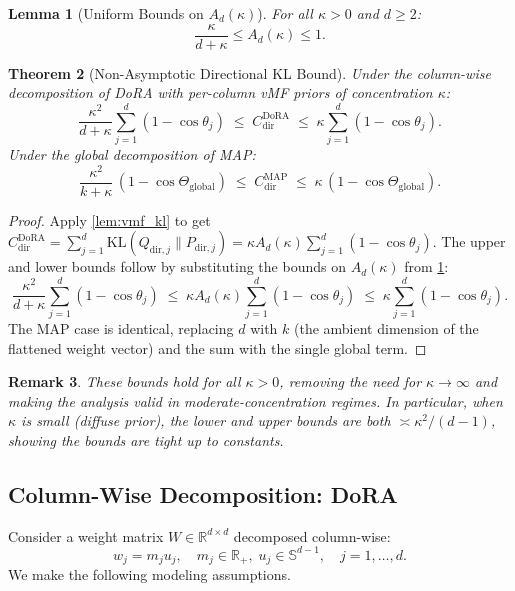 \documentclass[11pt]{article}
\newtheorem{theorem}{Theorem}[section]
\newtheorem{lemma}[theorem]{Lemma}
\newtheorem{remark}[theorem]{Remark}
\newcommand{\KL}{\mathrm{KL}}
\newcommand{\Ad}{A_d}
\newcommand{\Sd}{\mathbb{S}^{d-1}}
\newcommand{\R}{\mathbb{R}}
\begin{document}
\begin{lemma}[Uniform Bounds on $\Ad(\kappa)$]
\label{lem:ad_bounds}
For all $\kappa > 0$ and $d \geq 2$:
\[
  \frac{\kappa}{d + \kappa} \leq \Ad(\kappa) \leq 1.
\]
\end{lemma}

\begin{theorem}[Non-Asymptotic Directional KL Bound]
\label{thm:nonasymptotic}
Under the column-wise decomposition of DoRA with per-column vMF priors
of concentration $\kappa$:
\[
  \frac{\kappa^2}{d+\kappa} \sum_{j=1}^d (1 - \cos\theta_j)
  \;\leq\; C^{\mathrm{DoRA}}_{\mathrm{dir}}
  \;\leq\; \kappa \sum_{j=1}^d (1 - \cos\theta_j).
\]
Under the global decomposition of MAP:
\[
  \frac{\kappa^2}{k+\kappa}\,(1 - \cos\Theta_{\mathrm{global}})
  \;\leq\; C^{\mathrm{MAP}}_{\mathrm{dir}}
  \;\leq\; \kappa\,(1 - \cos\Theta_{\mathrm{global}}).
\]
\end{theorem}

\begin{proof}
Apply \cref{lem:vmf_kl} to get $C^{\mathrm{DoRA}}_{\mathrm{dir}}
= \sum_{j=1}^d \KL(Q_{\mathrm{dir},j} \| P_{\mathrm{dir},j})
= \kappa \Ad(\kappa) \sum_{j=1}^d (1 - \cos\theta_j)$.
The upper and lower bounds follow by substituting the bounds on
$\Ad(\kappa)$ from \cref{lem:ad_bounds}:
\[
  \frac{\kappa^2}{d+\kappa} \sum_{j=1}^d (1-\cos\theta_j)
  \;\leq\;
  \kappa\Ad(\kappa)\sum_{j=1}^d(1-\cos\theta_j)
  \;\leq\;
  \kappa\sum_{j=1}^d(1-\cos\theta_j).
\]
The MAP case is identical, replacing $d$ with $k$ (the ambient dimension
of the flattened weight vector) and the sum with the single global term.
\end{proof}

\begin{remark}
These bounds hold for all $\kappa > 0$, removing the need for
$\kappa \to \infty$ and making the analysis valid in
moderate-concentration regimes.
In particular, when $\kappa$ is small (diffuse prior), the lower and
upper bounds are both $\asymp \kappa^2 / (d-1)$, showing the bounds
are tight up to constants.
\end{remark}

\subsection{Column-Wise Decomposition: DoRA}
\label{sec:dora}

Consider a weight matrix $W \in \R^{d \times d}$ decomposed column-wise:
\[
  w_j = m_j u_j, \quad m_j \in \R_+,\; u_j \in \Sd, \quad j = 1,\ldots,d.
\]
We make the following modeling assumptions.
\end{document}
